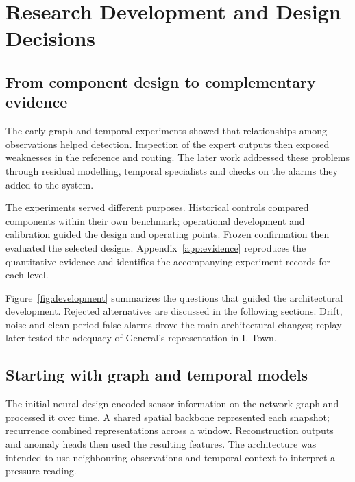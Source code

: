 \chapter{Research Development and Design Decisions}
\label{ch:development}

\section{From component design to complementary evidence}
The early graph and temporal experiments showed that relationships among observations helped detection. Inspection of the expert outputs then exposed weaknesses in the reference and routing. The later work addressed these problems through residual modelling, temporal specialists and checks on the alarms they added to the system.

The experiments served different purposes. Historical controls compared components within their own benchmark; operational development and calibration guided the design and operating points. Frozen confirmation then evaluated the selected designs. Appendix~\ref{app:evidence} reproduces the quantitative evidence and identifies the accompanying experiment records for each level.

Figure~\ref{fig:development} summarizes the questions that guided the architectural development. Rejected alternatives are discussed in the following sections. Drift, noise and clean-period false alarms drove the main architectural changes; replay later tested the adequacy of General's representation in L-Town.


\section{Starting with graph and temporal models}
The initial neural design encoded sensor information on the network graph and processed it over time. A shared spatial backbone represented each snapshot; recurrence combined representations across a window. Reconstruction outputs and anomaly heads then used the resulting features. The architecture was intended to use neighbouring observations and temporal context to interpret a pressure reading.

